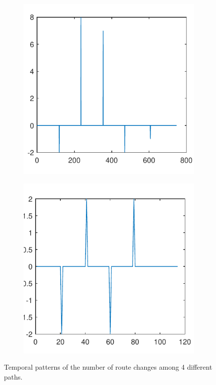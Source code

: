 \documentclass[sigconf]{acmart}
\begin{document}
\begin{figure}[!htp]
\begin{subfigure}[t]{0.4\linewidth}
			\label{fig:3.2b}
		\end{subfigure}
		\begin{subfigure}[t]{0.4\linewidth}
			\centering
			\includegraphics[width=0.95\linewidth, trim={100 100 0 0}, clip=true]{fig/route_change_21}
			\label{fig:3.2c}
		\end{subfigure}
		\begin{subfigure}[t]{0.4\linewidth}
			\centering
			\includegraphics[width=0.95\linewidth, trim={100 100 0 0}, clip]{fig/route_change_30}
			\label{fig:3.2d}
		\end{subfigure}
		\caption{Temporal patterns of the number of route changes among 4 different paths.}
		\label{fig:3.2}
	\end{figure}
	
\end{document}
